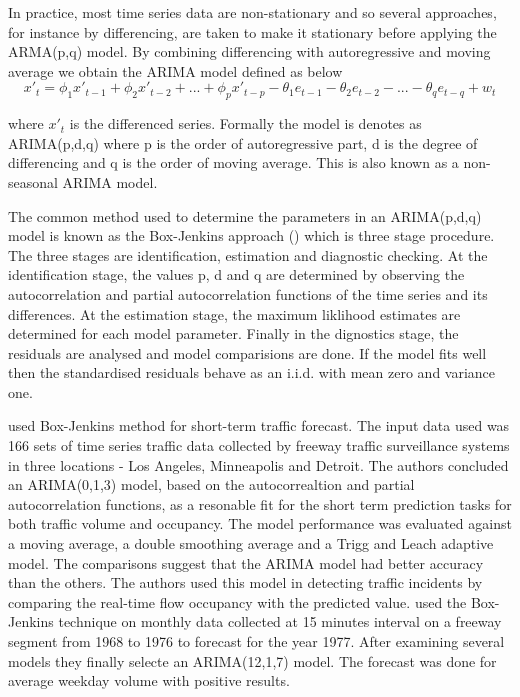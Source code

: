In practice, most time series data are non-stationary and so several approaches, for instance
by differencing, are taken to make it stationary before applying the ARMA(p,q) model. By
combining differencing with autoregressive and moving average we obtain the ARIMA model defined
as below
        \begin{equation} \label{eq:arima}
          x'_{t} = \phi_{1}x'_{t-1} + \phi_{2}x'_{t-2} + ... + \phi_{p}x'_{t-p} -
          \theta_{1}e_{t-1} - \theta_{2}e_{t-2} - ... - \theta_{q}e_{t-q} + w_{t}
        \end{equation}

where $x'_{t}$ is the differenced series. Formally the model is denotes as ARIMA(p,d,q) where p
is the order of autoregressive part, d is the degree of differencing and q is the order of moving
average. This is also known as a non-seasonal ARIMA model.

The common method used to determine the parameters in an ARIMA(p,d,q) model is known as the
Box-Jenkins approach (\citet{box2015time}) which is three stage procedure. The three stages are
identification, estimation and diagnostic checking. At the identification stage, the values p, d
and q are determined by observing the autocorrelation and partial autocorrelation functions of
the time series and its differences. At the estimation stage, the maximum liklihood estimates are
determined for each model parameter. Finally in the dignostics stage, the residuals are analysed
and model comparisions are done. If the model fits well then the standardised residuals behave as
an i.i.d. with mean zero and variance one.

\citet{ahmed1979analysis} used Box-Jenkins method for short-term traffic forecast. The input data
used was 166 sets of time series traffic data collected by freeway traffic surveillance systems in
three locations - Los Angeles, Minneapolis and Detroit. The authors concluded an ARIMA(0,1,3)
model, based on the autocorrealtion and partial autocorrelation functions, as a resonable fit for
the short term prediction tasks for both traffic volume and occupancy. The model performance was
evaluated against a moving average, a double smoothing average and a Trigg and Leach adaptive
model. The comparisons suggest that the ARIMA model had better accuracy than the others. The
authors used this model in detecting traffic incidents by comparing the real-time flow occupancy
with the predicted value. \citet{nihan1980use} used the Box-Jenkins technique on monthly data
collected at 15 minutes interval on a freeway segment from 1968 to 1976 to forecast for the year
1977. After examining several models they finally selecte an ARIMA(12,1,7) model. The forecast
was done for average weekday volume with positive results.

